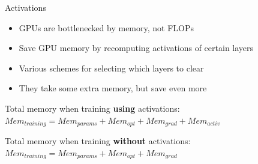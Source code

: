 
\begin{vbframe}{Activations}

\vfill

\begin{itemize}
 	\item GPUs are bottlenecked by memory, not FLOPs
 	\item Save GPU memory by recomputing activations of certain layers
	\item Various schemes for selecting which layers to clear
	\item They take some extra memory, but save even more
\end{itemize}

\vskip5mm

Total memory when training \textbf{using} activations: \newline
$Mem_{training} = Mem_{params} + Mem_{opt} + Mem_{grad} + Mem_{activ}$

\vskip5mm

Total memory when training \textbf{without} activations: \newline
$Mem_{training} = Mem_{params} + Mem_{opt} + Mem_{grad}$

\vskip5mm


\vfill

\end{vbframe}


\endlecture

